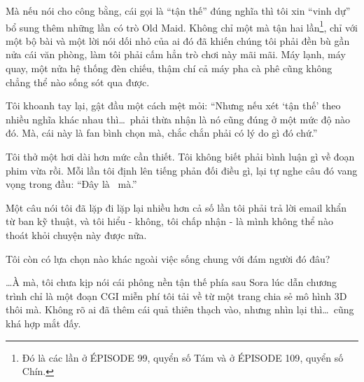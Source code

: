 \documentclass[../main.tex]{subfiles}
\begin{document}
Mà nếu nói cho công bằng, cái gọi là ``tận thế'' đúng nghĩa thì tôi xin ``vinh dự'' bổ sung thêm những lần có trò Old Maid. Không chỉ một mà tận hai lần\footnote{Đó là các lần ở {\flaregothic ÉPISODE 99}, quyển số Tám và ở {\flaregothic ÉPISODE 109}, quyển số Chín.}, chỉ với một bộ bài và một lời nói dối nhỏ của ai đó đã khiến chúng tôi phải đền bù gần nửa cái văn phòng, làm tôi phải cấm hẳn trò chơi này mãi mãi. Máy lạnh, máy quay, một nửa hệ thống đèn chiếu, thậm chí cả máy pha cà phê cũng không chẳng thể nào sống sót qua được.

Tôi khoanh tay lại, gật đầu một cách mệt mỏi: ``Nhưng nếu xét `tận thế' theo nhiều nghĩa khác nhau thì\dots\ phải thừa nhận là nó cũng đúng ở một mức độ nào đó. Mà, cái này là fan bình chọn mà, chắc chắn phải có lý do gì đó chứ.''

Tôi thở một hơi dài hơn mức cần thiết. Tôi không biết phải bình luận gì về đoạn phim vừa rồi. Mỗi lần tôi định lên tiếng phản đối điều gì, lại tự nghe câu đó vang vọng trong đầu: ``Đây là \hll\ mà.''

Một câu nói tôi đã lặp đi lặp lại nhiều hơn cả số lần tôi phải trả lời email khẩn từ ban kỹ thuật, và tôi hiểu - không, tôi chấp nhận - là mình không thể nào thoát khỏi chuyện này được nữa.

Tôi còn có lựa chọn nào khác ngoài việc sống chung với đám người đó đâu?

\dots À mà, tôi chưa kịp nói cái phông nền tận thế phía sau Sora lúc dẫn chương trình chỉ là một đoạn CGI miễn phí tôi tải về từ một trang chia sẻ mô hình 3D thôi mà. Không rõ ai đã thêm cái quả thiên thạch vào, nhưng nhìn lại thì\dots\ cũng khá hợp mắt đấy.
\end{document}
